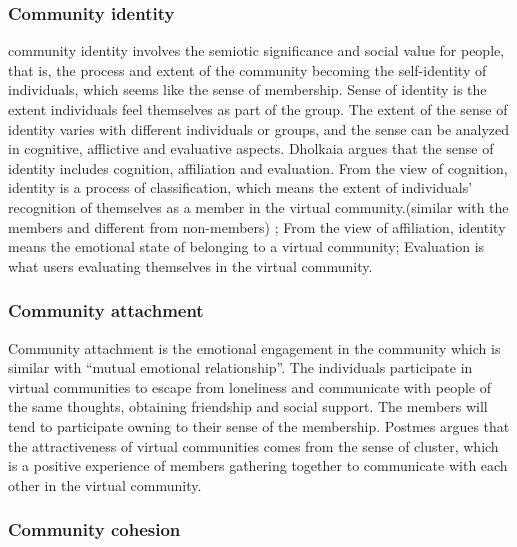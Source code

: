 \documentclass{elsarticle}
\begin{document}
\subsubsection{Community identity}
\label{sec:community-identiy}

community identity involves the semiotic significance and social value for people, that is, the process and extent of the community becoming the self-identity of individuals, which seems like the sense of membership. Sense of identity is the extent individuals feel themselves as part of the group. The extent of the sense of identity varies with different individuals or groups, and the sense can be analyzed in cognitive, afflictive and evaluative aspects\cite{warren1972ca}. Dholkaia argues that the sense of identity includes cognition, affiliation and evaluation\cite{dholakia2004sim}. From the view of cognition, identity is a process of classification, which means the extent of individuals’ recognition of themselves as a member in the virtual community.(similar with the members and different from non-members) ; From the view of affiliation, identity means the emotional state of belonging to a virtual community; Evaluation is what users evaluating themselves in the virtual community.    

\subsubsection{Community attachment}
\label{sec:community-attachment}

Community attachment is the emotional engagement in the community which is similar with “mutual emotional relationship”. The individuals participate in virtual communities to escape from loneliness and communicate with people of the same thoughts, obtaining friendship and social support. The members will tend to participate owning to their sense of the membership. Postmes argues that the attractiveness of virtual communities comes from the sense of cluster, which is a positive experience of members gathering together to communicate with each other in the virtual community\cite{t_postmes_formation_2000}.     

\subsubsection{Community cohesion}
\label{sec:community-cohesion}
\end{document}
